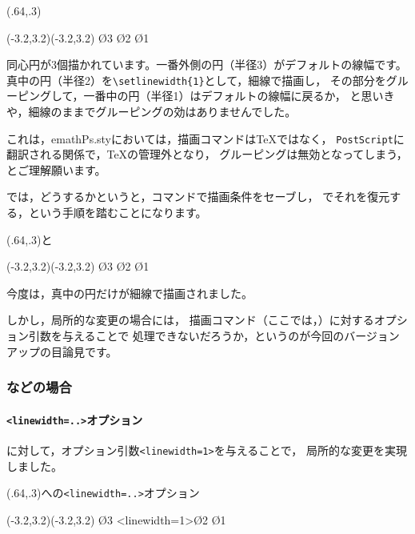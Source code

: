 \documentclass[a4j]{jarticle}
\begin{document}
\begin{showEx}(.64,.3){}
\begin{pszahyou*}[ul=4mm](-3.2,3.2)(-3.2,3.2)
  \En\O{3}
  {\En\O{2}}%
  \En\O{1}
\end{pszahyou*}
\end{showEx}

同心円が3個描かれています。一番外側の円（半径3）がデフォルトの線幅です。
真中の円（半径2）を\verb+\setlinewidth{1}+として，細線で描画し，
その部分をグルーピングして，一番中の円（半径1）はデフォルトの線幅に戻るか，
と思いきや，細線のままでグルーピングの効はありませんでした。

これは，\textsf{emathPs.sty}においては，描画コマンドは\TeX ではなく，
\texttt{PostScript}に翻訳される関係で，\TeX の管理外となり，
グルーピングは無効となってしまう，とご理解願います。

では，どうするかというと，コマンドで描画条件をセーブし，
でそれを復元する，という手順を踏むことになります。

\begin{showEx}(.64,.3){と}
\begin{pszahyou*}[ul=4mm](-3.2,3.2)(-3.2,3.2)
  \En\O{3}
  \gsave
    \En\O{2}
  \grestore
  \En\O{1}
\end{pszahyou*}
\end{showEx}

今度は，真中の円だけが細線で描画されました。

しかし，局所的な変更の場合には，
描画コマンド（ここでは，）に対するオプション引数を与えることで
処理できないだろうか，というのが今回のバージョンアップの目論見です。

\subsubsection{\texorpdfstring{}{En}などの場合}
\paragraph{\texttt{<linewidth=..>}オプション}
に対して，オプション引数\verb+<linewidth=1>+を与えることで，
局所的な変更を実現しました。

\begin{showEx}(.64,.3){への\texttt{<linewidth=..>}オプション}
\begin{pszahyou*}[ul=4mm](-3.2,3.2)(-3.2,3.2)
  \En\O{3}
  \En<linewidth=1>\O{2}
  \En\O{1}
\end{pszahyou*}
\end{showEx}
\end{document}
